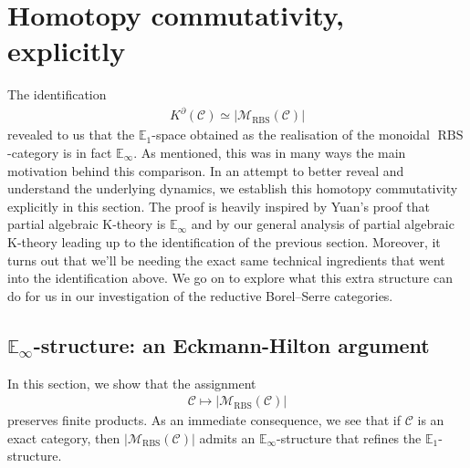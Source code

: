 \documentclass[12pt, reqno]{amsart}
\theoremstyle{plain}
\theoremstyle{definition}
\begin{document}
\section{Homotopy commutativity, explicitly}\label{homotopy commutativity}


The identification
\begin{align*}
K^\partial(\mathcal{C})\simeq |\mathscr{M}_{\operatorname{RBS}}(\mathcal{C})|
\end{align*}
revealed to us that the $\mathbb{E}_1$-space obtained as the realisation of the monoidal $\operatorname{RBS}$-category is in fact $\mathbb{E}_\infty$. As mentioned, this was in many ways the main motivation behind this comparison. In an attempt to better reveal and understand the underlying dynamics, we establish this homotopy commutativity explicitly in this section. The proof is heavily inspired by Yuan's proof that partial algebraic K-theory is $\mathbb{E}_\infty$ and by our general analysis of partial algebraic K-theory leading up to the identification of the previous section. Moreover, it turns out that we'll be needing the exact same technical ingredients that went into the identification above. We go on to explore what this extra structure can do for us in our investigation of the reductive Borel--Serre categories.




\subsection{\texorpdfstring{$\mathbb{E}_\infty$}{E-infinity}-structure: an Eckmann-Hilton argument}

In this section, we show that the assignment
\begin{align*}
\mathcal{C}\mapsto |\mathscr{M}_{\operatorname{RBS}}(\mathcal{C})|
\end{align*}
preserves finite products. As an immediate consequence, we see that if $\mathcal{C}$ is an exact category, then $|\mathscr{M}_{\operatorname{RBS}}(\mathcal{C})|$ admits an $\mathbb{E}_\infty$-structure that refines the $\mathbb{E}_1$-structure.
\end{document}
